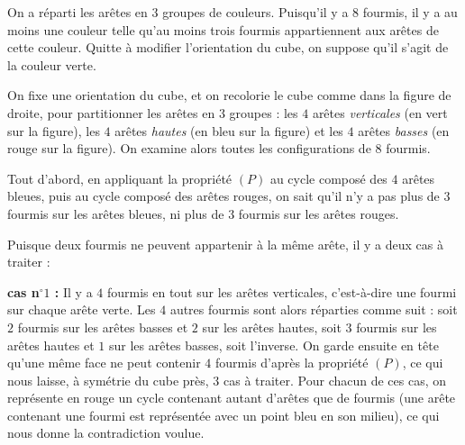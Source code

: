 On a réparti les arêtes en $3$ groupes de couleurs. Puisqu'il y a $8$ fourmis, il y a au moins une couleur telle qu'au moins trois fourmis appartiennent aux arêtes de cette couleur. Quitte à modifier l'orientation du cube, on suppose qu'il s'agit de la couleur verte.

\medskip

On fixe une orientation du cube, et on recolorie le cube comme dans la figure de droite, pour partitionner les arêtes en $3$ groupes : les $4$ arêtes \textit{verticales} (en vert sur la figure), les $4$ arêtes \textit{hautes} (en bleu sur la figure) et les $4$ arêtes \textit{basses} (en rouge sur la figure). On examine alors toutes les configurations de $8$ fourmis.


Tout d'abord, en appliquant la propriété $(P)$ au cycle composé des $4$ arêtes bleues, puis au cycle composé des arêtes rouges, on sait qu'il n'y a pas plus de $3$ fourmis sur les arêtes bleues, ni plus de $3$ fourmis sur les arêtes rouges.

Puisque deux fourmis ne peuvent appartenir à la même arête, il y a deux cas à traiter :

\textbf{cas n$^\circ 1$ :} Il y a $4$ fourmis en tout sur les arêtes verticales, c'est-à-dire une fourmi sur chaque arête verte. Les $4$ autres fourmis sont alors réparties comme suit : soit $2$ fourmis sur les arêtes basses et $2$ sur les arêtes hautes, soit $3$ fourmis sur les arêtes hautes et $1$ sur les arêtes basses, soit l'inverse. On garde ensuite en tête qu'une même face ne peut contenir $4$ fourmis d'après la propriété $(P)$, ce qui nous laisse, à symétrie du cube près, $3$ cas à traiter. Pour chacun de ces cas, on représente en rouge un cycle contenant autant d'arêtes que de fourmis (une arête contenant une fourmi est représentée avec un point bleu en son milieu), ce qui nous donne la contradiction voulue.

